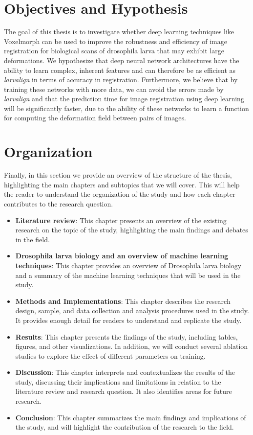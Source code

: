 \documentclass{report}
\begin{document}
	\section{Objectives and Hypothesis}
	The goal of this thesis is to investigate whether deep learning techniques like Voxelmorph \cite{Balakrishnan_2019} can be used to improve the robustness and efficiency of image registration for biological scans of drosophila larva that may exhibit large deformations. We hypothesize that deep neural network architectures have the ability to learn complex, inherent features and can therefore be as efficient as \textit{larvalign} \cite{larvalign} in terms of accuracy in registration. Furthermore, we believe that by training these networks with more data, we can avoid the errors made by \textit{larvalign} \cite{larvalign} and that the prediction time for image registration using deep learning will be significantly faster, due to the ability of these networks to learn a function for computing the deformation field between pairs of images.
	
	
	\section{Organization}
	Finally, in this section we provide an overview of the structure of the thesis, highlighting the main chapters and subtopics that we will cover. This will help the reader to understand the organization of the study and how each chapter contributes to the research question.
	
	\begin{itemize}
		\item \textbf{Literature review}: This chapter presents an overview of the existing research on the topic of the study, highlighting the main findings and debates in the field.
		\item \textbf{Drosophila larva biology and an overview of machine learning techniques}: This chapter provides an overview of Drosophila larva biology and a summary of the machine learning techniques that will be used in the study.
		\item \textbf{Methods and Implementations}: This chapter describes the research design, sample, and data collection and analysis procedures used in the study. It provides enough detail for readers to understand and replicate the study.
		\item \textbf{Results}: This chapter presents the findings of the study, including tables, figures, and other visualizations. In addition, we will conduct several ablation studies to explore the effect of different parameters on training.
		\item \textbf{Discussion}: This chapter interprets and contextualizes the results of the study, discussing their implications and limitations in relation to the literature review and research question. It also identifies areas for future research.
		\item \textbf{Conclusion}: This chapter summarizes the main findings and implications of the study, and will highlight the contribution of the research to the field.
	\end{itemize}
	
\end{document}
